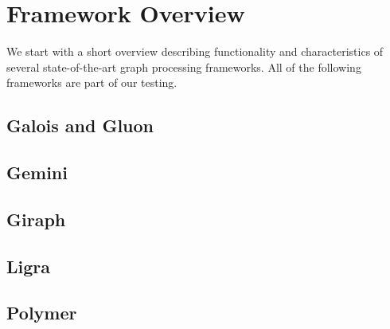 
\section{Framework Overview}
We start with a short overview describing functionality and characteristics of several state-of-the-art graph processing frameworks.
All of the following frameworks are part of our testing.

\subsection{Galois and Gluon}


\subsection{Gemini}


\subsection{Giraph}


\subsection{Ligra}


\subsection{Polymer}





